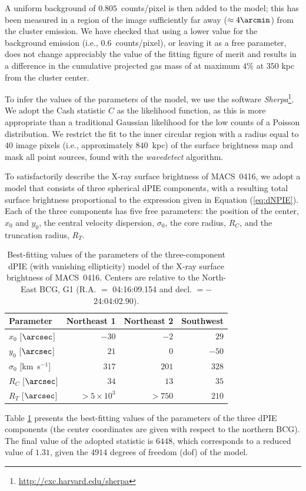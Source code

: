 \documentclass[twocolumn]{aastex61}
\begin{document}
A uniform background of $0.805$~counts/pixel \citep[similar to the value used in][]{Ogrean2015}
is then added to the model; this has been measured in a  region of the image
sufficiently far away ($\approx 4\arcmin$) from the cluster emission.
We have checked that using a lower value for the background emission (i.e., $0.6$~counts/pixel), or leaving it as
a free parameter, does not change appreciably the value of the fitting figure of
merit and results in a difference in the cumulative projected gas mass of at maximum $4\%$ at $350$ kpc from the
cluster center.

To infer the values of the parameters of the model, we use the software
\emph{Sherpa}\footnote{\url{http://cxc.harvard.edu/sherpa}}. We adopt the Cash statistic $C$
\citep{Cash1979} as the likelihood function, as this is more appropriate than
a traditional Gaussian likelihood for the low counts of a Poisson distribution.
We restrict the fit to the inner circular region with a radius equal to
$40$ image pixels (i.e., approximately $840$~kpc) of
the surface brightness map and mask all point sources, found with the \emph{wavedetect}
algorithm.

To satisfactorily describe the X-ray surface brightness of MACS~0416, we adopt a model
that consists of three spherical dPIE components, with a resulting total surface
brightness proportional to the expression given in Equation (\ref{eq:dNPIE}).
Each of the three components has five free parameters: the
position of the center, $x_0$ and $y_0$, the central velocity dispersion,
$\sigma_0$, the core radius, $R_C$, and the truncation radius, $R_T$.
\begin{table}
\centering
\begin{tabular}{lrrr}

\hline
\hline
Parameter & Northeast 1 & Northeast 2 & Southwest \\
\hline

$x_0$ [$\arcsec$] & $-30$ & $-2$ & $29$ \\
$y_0$ [$\arcsec$] & $21$ & $0$ & $-50$ \\
$\sigma_0$ [km~s$^{-1}$] & $317$ & $201$ & $328$ \\
$R_{C}$ [$\arcsec$] & $34$ & $13$ & $35$ \\
$R_{T}$ [$\arcsec$] & $>5\times 10^3$ & $>750$ & $210$ \\
\hline

\end{tabular}
\caption{Best-fitting values of the parameters of the three-component dPIE (with
vanishing ellipticity) model of the X-ray surface brightness of MACS~0416.
Centers are relative to the North-East BCG, G1 (R.A. $=$ 04:16:09.154 and
decl. $= -$24:04:02.90).\label{tab:sbfit_best}}
\end{table}
Table \ref{tab:sbfit_best} presents the best-fitting values of the parameters of
the three dPIE components (the center coordinates are given with
respect to the northern BCG).
The final value of the adopted statistic is $6448$, which corresponds to a reduced value of
$1.31$, given the $4914$ degrees of freedom (dof) of the model.
\end{document}
